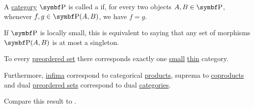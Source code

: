 \begin{definition}\label{def:thin_category}
  A \hyperref[def:category]{category} \( \Cat{P} \) is called a  if, for every two objects \( A, B \in \Bold{P} \), whenever \( f, g \in \Bold{P}(A, B) \), we have \( f = g \).

  If \( \Cat{P} \) is locally small, this is equivalent to saying that any set of morphisms \( \Bold{P}(A, B) \) is at most a singleton.
\end{definition}

\begin{proposition}\label{thm:preorder_category_correspondence}
  To every \hyperref[def:preordered_set]{preordered set} there corresponds exactly one \hyperref[def:category_cardinality]{small} \hyperref[def:thin_category]{thin} category.

  Furthermore, \hyperref[def:preordered_set/supremum_infimum]{infima} correspond to categorical \hyperref[def:categorical_product]{products}, suprema to \hyperref[def:categorical_coproduct]{coproducts} and dual \hyperref[def:preordered_set/dual]{preordered sets} correspond to dual \hyperref[def:opposite_category]{categories}.

  Compare this result to .
\end{proposition}
